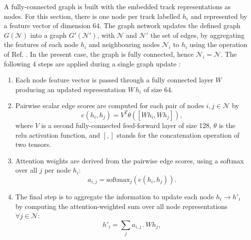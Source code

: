 A fully-connected graph is built with the embedded track representations as nodes. For this section, there is one node per track labelled $h_i$ and represented by a feature vector of dimension 64. The graph network updates the defined graph $G(\mathcal{N})$ into a graph $G'(\mathcal{N}')$, with $\mathcal{N}$ and $\mathcal{N}'$ the set of edges, by aggregating the features of each node $h_i$ and neighbouring nodes $\mathcal{N}_i$ to $h_i$ using the operation of Ref. \cite{brody2022how}. In the present case, the graph is fully connected, hence $\mathcal{N}_i = \mathcal{N}$. The following 4 steps are applied during a single graph update \cite{ATL-PHYS-PUB-2022-027}:
\begin{enumerate}
  \item Each node feature vector is passed through a fully connected layer $W$ producing an updated representation $W\,h_i$ of size 64.
  \item Pairwise scalar edge scores are computed for each pair of nodes $i, j \in \mathcal{N}$ by 
  \begin{equation}
    e\left(h_i, h_j\right) = V^T \theta\left([Wh_i, Wh_j]\right),
  \end{equation}
  where $V$ is a second fully-connected feed-forward layer of size 128, $\theta$ is the \gls{relu} activation function, and $[,]$ stands for the concatenation operation of two tensors. 
  \item Attention weights are derived from the pairwise edge scores, using a softmax over all $j$ per node $h_i$:
  \begin{equation}
    a_{i,j} = \textrm{softmax}_j\left(e(h_i, h_j)\right).
  \end{equation}
  \item The final step is to aggregate the information to update each node $h_i \rightarrow h'_i$ by computing the attention-weighted sum over all node representations $\forall j \in \mathcal{N}$: 
  \begin{equation}
    h'_i = \sum_{j} a_{i,j} \,.\, W h_j,
  \end{equation} 
\end{enumerate}

